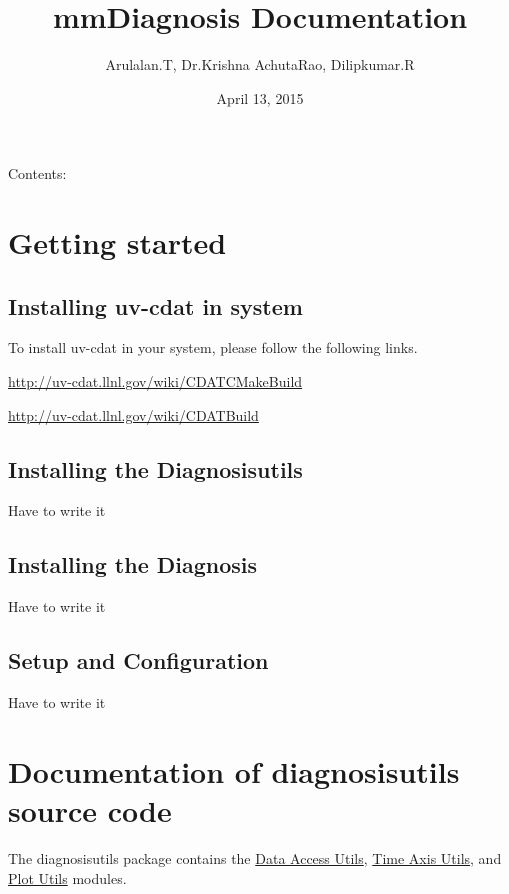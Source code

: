 \documentclass[letterpaper,10pt,english]{sphinxmanual}
\title{mmDiagnosis Documentation}
\date{April 13, 2015}
\author{Arulalan.T, Dr.Krishna AchutaRao, Dilipkumar.R}
\begin{document}
\maketitle
\tableofcontents
{}\label{index::doc}


Contents:


\chapter{Getting started}
\label{getting_started:getting-started}\label{getting_started::doc}\label{getting_started:id1}\label{getting_started:welcome-to-mmdiagnosis-s-documentation}

\section{Installing uv-cdat in system}
\label{getting_started:installing-uv-cdat-in-system}
To install uv-cdat in your system, please follow the following links.

\href{http://uv-cdat.llnl.gov/wiki/CDATCMakeBuild}{http://uv-cdat.llnl.gov/wiki/CDATCMakeBuild}

\href{http://uv-cdat.llnl.gov/wiki/CDATBuild}{http://uv-cdat.llnl.gov/wiki/CDATBuild}


\section{Installing the Diagnosisutils}
\label{getting_started:installing-the-diagnosisutils}
Have to write it


\section{Installing the Diagnosis}
\label{getting_started:installing-the-diagnosis}
Have to write it


\section{Setup and Configuration}
\label{getting_started:setup-and-configuration}
Have to write it


\chapter{Documentation of \textbf{diagnosisutils} source code}
\label{diagnosisutils:documentation-of-diagnosisutils-source-code}\label{diagnosisutils:diagnosisutils}\label{diagnosisutils::doc}
The diagnosisutils package contains the {\hyperref[diagnosisutils:data-access-utils]{Data Access Utils}}, {\hyperref[diagnosisutils:time-axis-utils]{Time Axis Utils}}, and {\hyperref[diagnosisutils:plot-utils]{Plot Utils}} modules.
\end{document}
